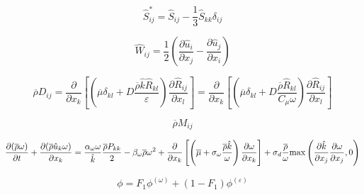 {\newpage\clearpage
{}%
\begin{displaymath}
\hat S_{ij}^* = \hat S_{ij} - \frac{1}{3} \hat S_{kk} \delta_{ij}
\end{displaymath}%
\lthtmldisplayZ
\lthtmlcheckvsize\clearpage}

{\newpage\clearpage
{}%
\begin{displaymath}
\hat W_{ij} = \frac{1}{2} \left( \frac{\partial \hat u_i}{\partial x_j} -
\frac{\partial \hat u_j}{\partial x_i} \right)
\end{displaymath}%
\lthtmldisplayZ
\lthtmlcheckvsize\clearpage}

{\newpage\clearpage
{}%
\begin{displaymath}
\overline \rho D_{ij} = \frac{\partial}{\partial x_k}
\left[ \left( \overline \mu \delta_{kl} + D \frac{\overline \rho \hat k \hat R_{kl}}{\varepsilon}
\right) \frac{\partial \hat R_{ij}}{\partial x_l} \right]
= \frac{\partial}{\partial x_k}
\left[ \left( \overline \mu \delta_{kl} + D \frac{\overline \rho \hat R_{kl}}{C_{\mu} \omega}
\right) \frac{\partial \hat R_{ij}}{\partial x_l} \right]
\end{displaymath}%
\lthtmldisplayZ
\lthtmlcheckvsize\clearpage}

{\newpage\clearpage
{}%
\begin{displaymath}
\overline \rho M_{ij}
\end{displaymath}%
\lthtmldisplayZ
\lthtmlcheckvsize\clearpage}

{\newpage\clearpage
{}%
\begin{displaymath}
\frac{\partial (\overline \rho \omega)}{\partial t} +
  \frac{\partial (\overline \rho \hat u_k \omega)}{\partial x_k}
  = \frac{\alpha_{\omega} \omega}{\hat k} \frac{\overline \rho P_{kk}}{2} -
  \beta_{\omega} \overline \rho \omega^2 + \frac{\partial}{\partial x_k}
  \left[ \left( \overline \mu + \sigma_{\omega} \frac{\overline \rho \hat k}{\omega} \right)
  \frac{\partial \omega}{\partial x_k} \right] +
  \sigma_d \frac{\overline \rho}{\omega} {\rm max} \left( \frac{\partial \hat k}{\partial x_j}
  \frac{\partial \omega}{\partial x_j}, 0 \right)
\end{displaymath}%
\lthtmldisplayZ
\lthtmlcheckvsize\clearpage}

{\newpage\clearpage
{}%
\begin{displaymath}
\phi = F_1 \phi^{(\omega)} + (1-F_1) \phi^{(\varepsilon)}
\end{displaymath}%
\lthtmldisplayZ
\lthtmlcheckvsize\clearpage}


